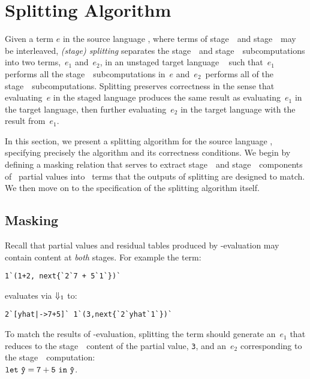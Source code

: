 \section{Splitting Algorithm}
\label{sec:splitting}

Given a term $e$ in the source language \lang, where terms of
stage~\bbone\ and stage~\bbtwo\ may be interleaved, \emph{(stage)
  splitting} separates the stage~\bbone\ and stage~\bbtwo\
subcomputations into two terms,~$e_1$ and~$e_2$, in an unstaged target language \langmono\ 
such that~$e_1$ performs all the
stage~\bbone\ subcomputations in~$e$ and~$e_2$~performs all of the
stage~\bbtwo\ subcomputations. Splitting preserves correctness in the sense that evaluating~$e$ in
the staged language produces the same result as evaluating~$e_1$ in the target language,
then further evaluating~$e_2$ in the target language with the result from~$e_1$.

In this section, we present a
splitting algorithm for the source language \lang, specifying
precisely the algorithm and its correctness conditions.  
We begin by defining a masking relation that serves to extract stage~\bbone\ and
stage~\bbtwo\ components of \lang\ partial values into \langmono\ terms that the outputs of splitting are designed to match. We then 
move on to the specification of the splitting algorithm itself.


\subsection{Masking}

Recall that partial values and residual tables produced by \bbone-evaluation may
contain content at \emph{both} stages. For example the term:
\begin{lstlisting}
1`(1+2, next{`2`7 + 5`1`})`
\end{lstlisting}
evaluates via ${\Downarrow_{ 1}}$ to:
\begin{lstlisting}
2`[yhat|->7+5]` 1`(3,next{`2`yhat`1`})`
\end{lstlisting}
To match the results of \bbone-evaluation,
splitting the term should generate an~$e_1$ that reduces to the stage~\bbone\ content of the partial value, \texttt{3},
and an~$e_2$ corresponding to the stage~\bbtwo\ computation: \\
${\tt let}~{\mathtt{\hat y}} = {\mathtt{7+5}}~{\tt in}~{\mathtt{\hat y}}$.

